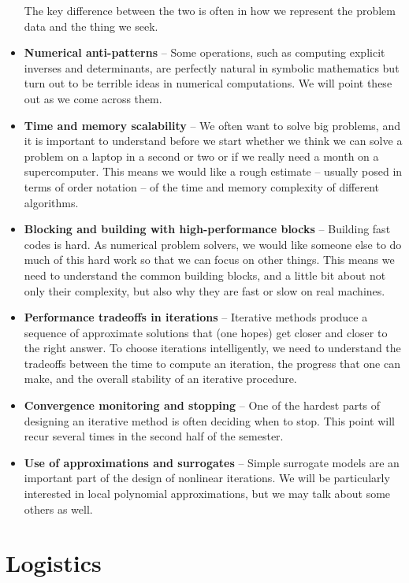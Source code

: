 \documentclass[12pt, leqno]{article}
\begin{document}
\begin{itemize}
  The key difference between the two is often in how we represent the
  problem data and the thing we seek.
\item {\bf Numerical anti-patterns} -- Some operations, such as
  computing explicit inverses and determinants, are perfectly natural
  in symbolic mathematics but turn out to be terrible ideas in
  numerical computations.  We will point these out as we come across
  them.
\item {\bf Time and memory scalability} -- We often want to solve
  big problems, and it is important to understand before we start
  whether we think we can solve a problem on a laptop in a second or
  two or if we really need a month on a supercomputer.  This means
  we would like a rough estimate -- usually posed in terms of order notation
  -- of the time and memory complexity of different algorithms.
\item {\bf Blocking and building with high-performance blocks} --
  Building fast codes is hard.  As numerical problem solvers, we would
  like someone else to do much of this hard work so that we can focus
  on other things.  This means we need to understand the common
  building blocks, and a little bit about not only their complexity,
  but also why they are fast or slow on real machines.
\item {\bf Performance tradeoffs in iterations} -- Iterative methods
  produce a sequence of approximate solutions that (one hopes) get
  closer and closer to the right answer.  To choose iterations
  intelligently, we need to understand the tradeoffs between the
  time to compute an iteration, the progress that one can make, and
  the overall stability of an iterative procedure.
\item {\bf Convergence monitoring and stopping} -- One of the hardest
  parts of designing an iterative method is often deciding when to
  stop.  This point will recur several times in the second half of the
  semester.
\item {\bf Use of approximations and surrogates} -- Simple surrogate
  models are an important part of the design of nonlinear iterations.
  We will be particularly interested in local polynomial
  approximations, but we may talk about some others as well.
\end{itemize}

\section*{Logistics}
\end{document}
